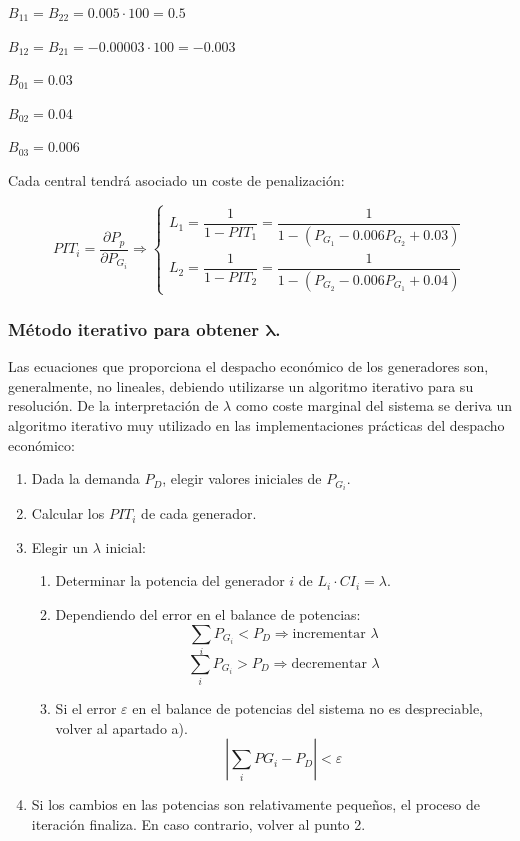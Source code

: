 					$B_{11} = B_{22} = 0.005\cdot 100 = 0.5$
					
					$B_{12} = B_{21} = -0.00003\cdot 100 = -0.003$
					
					$B_{01} = 0.03$
					
					$B_{02} = 0.04$
					
					$B_{03} = 0.006$
					
					Cada central tendrá asociado un coste de penalización:
					
					\[PIT_i = \dfrac{\partial P_p}{\partial P_{G_i}} \Rightarrow
						\left\{
							\begin{matrix}
								L_1 = \dfrac{1}{1 - PIT_1} = \dfrac{1}{1 - (P_{G_1} - 0.006 P_{G_2} + 0.03)}\\
								L_2 = \dfrac{1}{1 - PIT_2} = \dfrac{1}{1 - (P_{G_2} - 0.006 P_{G_1} + 0.04)}
							\end{matrix}
						\right.
					\]
					
				\subsubsection{Método iterativo para obtener $\mathbf{\lambda}$.}
					Las ecuaciones que proporciona el despacho económico de los generadores son, generalmente, no lineales, debiendo utilizarse un algoritmo iterativo para su resolución. De la interpretación de $\lambda$ como coste marginal del sistema se deriva un algoritmo iterativo muy utilizado en las implementaciones prácticas del despacho económico:
					\begin{enumerate}
						\item Dada la demanda $P_D$, elegir valores iniciales de $P_{G_i}$.
						\item Calcular los $PIT_i$ de cada generador.
						\item Elegir un $\lambda$ inicial:
							\begin{enumerate}
								\item Determinar la potencia del generador $i$ de $L_i \cdot CI_i = \lambda$.
								\item Dependiendo del error en el balance de potencias:
								\[\sum_i P_{G_i} < P_D \Rightarrow \text{incrementar }\lambda\]
								\[\sum_i P_{G_i} > P_D \Rightarrow \text{decrementar }\lambda\]
								\item Si el error $\varepsilon$ en el balance de potencias del sistema no es despreciable, volver al apartado a).
								\[\left|\sum_i P{G_i} - P_D\right| < \varepsilon\]
 							\end{enumerate}
 						\item Si los cambios en las potencias son relativamente pequeños, el proceso de iteración finaliza. En caso contrario, volver al punto 2.
					\end{enumerate}
				
